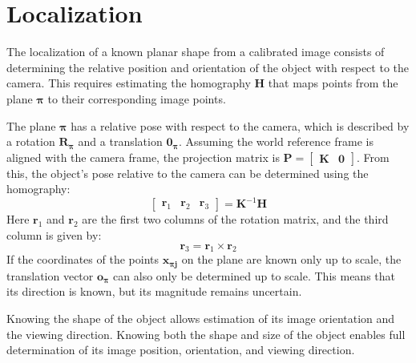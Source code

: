 \section{Localization}

The localization of a known planar shape from a calibrated image consists of determining the relative position and orientation of the object with respect to the camera. 
This requires estimating the homography $\mathbf{H}$ that maps points from the plane $\boldsymbol{\pi}$ to their corresponding image points.

The plane $\boldsymbol{\pi}$ has a relative pose with respect to the camera, which is described by a rotation $\mathbf{R}_{\boldsymbol{\pi}}$ and a translation $\mathbf{0}_{\boldsymbol{\pi}}$. 
Assuming the world reference frame is aligned with the camera frame, the projection matrix is $\mathbf{P}=\begin{bmatrix}\mathbf{K} & \mathbf{0} \end{bmatrix}$. 
From this, the object's pose relative to the camera can be determined using the homography:
\[\begin{bmatrix} \mathbf{r}_1 & \mathbf{r}_2 & \mathbf{r}_3 \end{bmatrix}=\mathbf{K}^{-1}\mathbf{H}\]
Here $\mathbf{r}_1$ and $\mathbf{r}_2$ are the first two columns of the rotation matrix, and the third column is given by:
\[\mathbf{r}_3=\mathbf{r}_1\times \mathbf{r}_2\]
If the coordinates of the points $\mathbf{x}_{\boldsymbol{\pi}\mathbf{j}}$ on the plane are known only up to scale, the translation vector $\mathbf{o}_{\boldsymbol{\pi}}$ can also only be determined up to scale. 
This means that its direction is known, but its magnitude remains uncertain.

Knowing the shape of the object allows estimation of its image orientation and the viewing direction.
Knowing both the shape and size of the object enables full determination of its image position, orientation, and viewing direction.